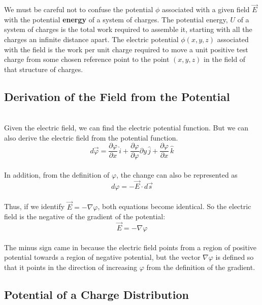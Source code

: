 \documentclass[svgnames]{article}
\begin{document}
We must be careful not to confuse the potential $\phi$ associated with a given field $\vec{E}$ with the potential \textbf{energy} of a system of charges. The potential energy, $U$ of a system of charges is the total work required to assemble it, starting with all the charges an infinite distance apart. The electric potential $\phi(x, y, z)$ associated with the field is the work per unit charge required to move a unit positive test charge from some chosen reference point to the point $(x, y, z)$ in the field of that structure of charges. \\

\subsection{Derivation of the Field from the Potential}  \mbox{} \\ 

Given the electric field, we can find the electric potential function. But we can also derive the electric field from the potential function. \\

\[d\vec{\varphi} = \frac{\partial \varphi}{\partial x} \, \hat{i} + \frac{\partial \varphi}{\partial \varphi}{\partial y} \, \hat{j} + \frac{\partial \varphi}{\partial x} \, \hat{k} \] \\

In addition, from the definition of $\varphi$, the change can also be represented as \\

\[ d\varphi = - \vec{E} \cdot d\vec{s} \] \\

Thus, if we identify $\vec{E} = - \nabla \varphi$, both equations become identical. So the electric field is the negative of the gradient of the potential:\\

 \[ \vec{E} = - \nabla \varphi \] \\
 
 The minus sign came in because the electric field points from a region of positive potential towards a region of negative potential, but the vector $\nabla \varphi$ is defined so that it points in the direction of increasing $\varphi$ from the definition of the gradient. \\
 
 \subsection{Potential of a Charge Distribution}
 
\end{document}
